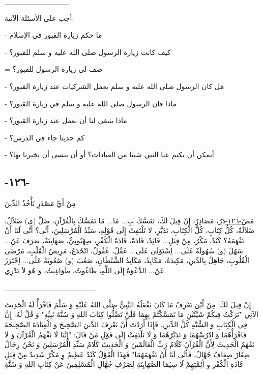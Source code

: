 \documentclass[a5paper]{article}
\begin{document}
\_\_\_\_\_\_\_\_\_\_\_\_

أجب على الأسئلة الآتية:

- ما حكم زيارة القبور في الإسلام

- كيف كانت زيارة الرسول صلى الله عليه و سلم للقبور؟ 

= صف لي زيارة الرسول للقبور؟

- هل كان الرسول صلى الله عليه و سلم يعمل الشركيات عند زيارة القبور؟

- ماذا قان الرسول صلى الله عليه و سلم في زيارة القبور؟

- ماذا ينبغي لنا أن نعمل عند زيارة القبور؟

- كم حديثا جاء في الدرس؟

- أيمكن أن يكتم عنا النبي شيئا من العبادات؟ أو أن ينسى أن يخبرنا بها؟

\subsection{-١٢٦-}
مِنْ أَيِّ مَصْدَرٍ نَأْخُذُ الدِّينَ

مَصْ\hyperlink{a0122outline}{-١٢٦-}دَرٌ، مَصَادِرُ، إِنْ قِيلَ لَكَ، تَمَسَّكَ بِ... مَا... مَا تَمَسَّكَ بِالْقُرْآنِ، ضَلَّ (ى) ضَلاَلٌ، ضَلاَلَةٌ، كُلُّ كِتَابٍ، كُلُّ الْكِتَابِ، تَدَبَّرِ، لا تَلْتَفِتْ إِلَى قَوْلِهِ، سَيِّدُ الْمُرْسَلِينَ، أَنَّى؟ أَنَّى لَنَا أَنْ نَفْهَمَهُ؟ كَيْدٌ، مَكْرٌ، مِنْ قِبَلِ... قَائِدٌ، قَادَةٌ، قَادَةُ الْكُفْرِ، صِهْيُونِيٌّ، صَهَايِنَةٌ، صَرَفَ عَنْ... سَهُلَ (و) سُهُولَةٌ عَلَى... اِسْتَوْلَى عَلَى... عَقْلٌ، عُقُولٌ، انْخَدَعَ، مَرِيضُ الْقَلْبِ، مَرْضَى الْقُلُوبِ، جَاهِلٌ بِالدِّينِ، مَكِيدَةٌ، مَكَايِدُ، مَكَايِدُ الشَّيْطَانِ، صَعُبَ (و) صُعُوبَةٌ عَلَى... اِحْتَرَزَ عَنْ... الدَّعْوَةُ إِلَى اللَّهِ، طَاغُوتٌ، طَوَاغِيتُ، وَ هُوَ لاَ يَدْرِي.

\_\_\_\_\_\_\_\_\_\_\_\_\_\_\_\_\_

إِنْ قِيلَ لَكَ: مِنْ أَيْنَ نَعْرِفُ مَا كَانَ يَفْعَلُهُ النَّبِيُّ صَلَّى اللهُ عَلَيْهِ وَ سَلَّمَ فَاقْرَأْ لَهُ الْحَدِيثَ الآتِي "تَرَكْتُ فِيكُمْ شَيْئَيْنِ مَا تَمَسَّكْتُمْ بِهِمَا فَلَنْ تَضْلُّوا كِتَابَ اللهِ وَ سُنَّةَ نَبِيِّهِ" وَ قُلْ لَهُ: إِنَّ فِي الْكِتَابِ وَ السُّنَّةِ كُلَّ الدِّينِ، فَإِذَا أَرَدْتَ أَنْ تَعْرِفَ الدَّينَ الصَّحِيحَ وَ الْعِبَادَةَ الصَّحِيحَةَ فَاقْرَأْهُمَا وَ ادْرُسَْهُمَا وَ تَدَبَّرْهُمَا وَ لَا تَلْتَفِتْ إِلَى فَوْلِ مَنْ قَالَ: "إِنَّنَا لَا نَفْهَمُ الْقُرْآنَ وَ لَا نَفْهَمُ الْحَدِيثَ لِأَنَّ الْقُرْآنَ كَلَامُ رَبِّ الْعَالَمْينَ وَ الْحَدِيثَ كَلَامُ سَيِّدِ الْمُرْسَلِينَ وَ نَحْنُ رِجَالٌ صِغَارٌ ضِعَافٌ جُهَّالٌ، فَأَنَّى لَنَا أَنْ نَفْهَمَهُمَا" فَهَذَا الْقَوْلُ كَيْدٌ عَظِيمٌ وِ مَكْرٌ شَدِيدٌ مِنْ قِبَلِ قَادَةِ الْكُفْرِ وِ أَئِمَّتِهِمْ لَا سِيَمَا الصَّهَايِنَةِ لِصَرْفِ جُهَّالِ الْمُسْلِمِينَ عَنْ كِتَابِ اللهِ وَ سُنَّةِ
\end{document}
